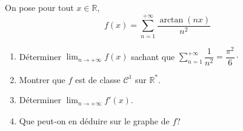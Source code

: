 \documentclass[a4paper,twoside,french,11pt]{VcCours}
\begin{document}
\medskip



\begin{Exercice}{} On pose pour tout $x \in \mathbb{R}$,
$$ f(x) = \sum_{n=1}^{+ \infty} \dfrac{\arctan(nx)}{n^2}$$
\begin{enumerate}
\item Déterminer $\lim_{n \rightarrow + \infty} f(x)$ sachant que $\sum_{n=1}^{+ \infty} \dfrac{1}{n^2} = \dfrac{\pi^2}{6} \cdot$
\item Montrer que $f$ est de classe $\mathcal{C}^1$ sur $\mathbb{R}^*$.
\item Déterminer $\lim_{n \rightarrow + \infty} f'(x)$.
\item Que peut-on en déduire sur le graphe de $f$?
\end{enumerate}
\end{Exercice}
\end{document}
